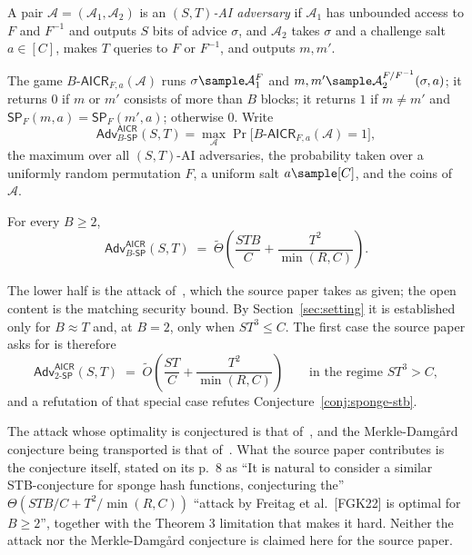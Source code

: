 \documentclass{conjura-conjecture}
\newcommand{\SP}{\mathsf{SP}}
\newcommand{\Adv}{\mathsf{Adv}}
\newcommand{\AICR}{\mathsf{AICR}}
\newcommand{\tO}{\tilde{O}}
\newcommand{\tTh}{\tilde{\Theta}}
\begin{document}
\begin{definition}\label{def:aicr}
A pair $\mathcal{A} = (\mathcal{A}_{1}, \mathcal{A}_{2})$ is an
\emph{$(S,T)$-AI adversary} if $\mathcal{A}_{1}$ has unbounded access
to $F$ and $F^{-1}$ and outputs $S$ bits of advice $\sigma$, and
$\mathcal{A}_{2}$ takes $\sigma$ and a challenge salt $a \in [C]$,
makes $T$ queries to $F$ or $F^{-1}$, and outputs $m, m'$.

The game $B\text{-}\AICR_{F,a}(\mathcal{A})$ runs
$\sigma \sample \mathcal{A}_{1}^{F}$ and
$m, m' \sample \mathcal{A}_{2}^{F/F^{-1}}(\sigma, a)$; it returns $0$
if $m$ or $m'$ consists of more than $B$ blocks; it returns $1$ if
$m \ne m'$ and $\SP_{F}(m,a) = \SP_{F}(m',a)$; otherwise $0$. Write
\[
  \Adv^{\AICR}_{B\text{-}\SP}(S,T)
  = \max_{\mathcal{A}}
    \Pr\bigl[B\text{-}\AICR_{F,a}(\mathcal{A}) = 1\bigr],
\]
the maximum over all $(S,T)$-AI adversaries, the probability taken over
a uniformly random permutation $F$, a uniform salt $a \sample [C]$, and
the coins of $\mathcal{A}$.
\end{definition}

\begin{conjecture}\label{conj:sponge-stb}
For every $B \ge 2$,
\[
  \Adv^{\AICR}_{B\text{-}\SP}(S,T)
  \;=\; \tTh\!\left(\frac{STB}{C}
        + \frac{T^{2}}{\min(R,C)}\right).
\]
\end{conjecture}

The lower half is the attack of~\cite{FGK22}, which the source paper
takes as given; the open content is the matching security bound. By
Section~\ref{sec:setting} it is established only for $B \approx T$ and,
at $B = 2$, only when $ST^{3} \le C$. The first case the source paper
asks for is therefore
\[
  \Adv^{\AICR}_{2\text{-}\SP}(S,T)
  \;=\; \tO\!\left(\frac{ST}{C}
        + \frac{T^{2}}{\min(R,C)}\right)
  \qquad \text{in the regime } ST^{3} > C,
\]
and a refutation of that special case refutes
Conjecture~\ref{conj:sponge-stb}.

\begin{remark}\label{rem:attribution}
The attack whose optimality is conjectured is that
of~\cite{FGK22}, and the Merkle-Damg\aa{}rd conjecture being
transported is that of~\cite{ACDW20}. What the source paper contributes
is the conjecture itself, stated on its p.~8 as ``It is natural to
consider a similar STB-conjecture for sponge hash functions,
conjecturing the'' $\Theta(STB/C + T^{2}/\min(R,C))$ ``attack by
Freitag et al.\ [FGK22] is optimal for $B \ge 2$'', together with the
Theorem 3 limitation that makes it hard. Neither the attack nor the
Merkle-Damg\aa{}rd conjecture is claimed here for the source paper.
\end{remark}
\end{document}

